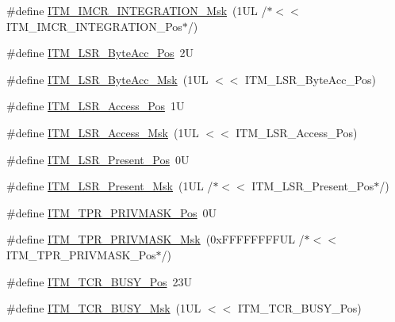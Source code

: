 \begin{DoxyCompactItemize}
\#define \mbox{\hyperlink{group___c_m_s_i_s___i_t_m_ga8838bd3dd04c1a6be97cd946364a3fd2}{I\+T\+M\+\_\+\+I\+M\+C\+R\+\_\+\+I\+N\+T\+E\+G\+R\+A\+T\+I\+O\+N\+\_\+\+Msk}}~(1\+U\+L /$\ast$$<$$<$ I\+T\+M\+\_\+\+I\+M\+C\+R\+\_\+\+I\+N\+T\+E\+G\+R\+A\+T\+I\+O\+N\+\_\+\+Pos$\ast$/)
\item 
\#define \mbox{\hyperlink{group___c_m_s_i_s___i_t_m_gabfae3e570edc8759597311ed6dfb478e}{I\+T\+M\+\_\+\+L\+S\+R\+\_\+\+Byte\+Acc\+\_\+\+Pos}}~2U
\item 
\#define \mbox{\hyperlink{group___c_m_s_i_s___i_t_m_ga91f492b2891bb8b7eac5b58de7b220f4}{I\+T\+M\+\_\+\+L\+S\+R\+\_\+\+Byte\+Acc\+\_\+\+Msk}}~(1\+U\+L $<$$<$ I\+T\+M\+\_\+\+L\+S\+R\+\_\+\+Byte\+Acc\+\_\+\+Pos)
\item 
\#define \mbox{\hyperlink{group___c_m_s_i_s___i_t_m_ga144a49e12b83ad9809fdd2769094fdc0}{I\+T\+M\+\_\+\+L\+S\+R\+\_\+\+Access\+\_\+\+Pos}}~1U
\item 
\#define \mbox{\hyperlink{group___c_m_s_i_s___i_t_m_gac8ae69f11c0311da226c0c8ec40b3d37}{I\+T\+M\+\_\+\+L\+S\+R\+\_\+\+Access\+\_\+\+Msk}}~(1\+U\+L $<$$<$ I\+T\+M\+\_\+\+L\+S\+R\+\_\+\+Access\+\_\+\+Pos)
\item 
\#define \mbox{\hyperlink{group___c_m_s_i_s___i_t_m_gaf5740689cf14564d3f3fd91299b6c88d}{I\+T\+M\+\_\+\+L\+S\+R\+\_\+\+Present\+\_\+\+Pos}}~0U
\item 
\#define \mbox{\hyperlink{group___c_m_s_i_s___i_t_m_gaa5bc2a7f5f1d69ff819531f5508bb017}{I\+T\+M\+\_\+\+L\+S\+R\+\_\+\+Present\+\_\+\+Msk}}~(1\+U\+L /$\ast$$<$$<$ I\+T\+M\+\_\+\+L\+S\+R\+\_\+\+Present\+\_\+\+Pos$\ast$/)
\item 
\#define \mbox{\hyperlink{group___c_m_s_i_s___i_t_m_ga7abe5e590d1611599df87a1884a352e8}{I\+T\+M\+\_\+\+T\+P\+R\+\_\+\+P\+R\+I\+V\+M\+A\+S\+K\+\_\+\+Pos}}~0U
\item 
\#define \mbox{\hyperlink{group___c_m_s_i_s___i_t_m_ga168e089d882df325a387aab3a802a46b}{I\+T\+M\+\_\+\+T\+P\+R\+\_\+\+P\+R\+I\+V\+M\+A\+S\+K\+\_\+\+Msk}}~(0x\+F\+F\+F\+F\+F\+F\+F\+F\+U\+L /$\ast$$<$$<$ I\+T\+M\+\_\+\+T\+P\+R\+\_\+\+P\+R\+I\+V\+M\+A\+S\+K\+\_\+\+Pos$\ast$/)
\item 
\#define \mbox{\hyperlink{group___c_m_s_i_s___i_t_m_ga9174ad4a36052c377cef4e6aba2ed484}{I\+T\+M\+\_\+\+T\+C\+R\+\_\+\+B\+U\+S\+Y\+\_\+\+Pos}}~23U
\item 
\#define \mbox{\hyperlink{group___c_m_s_i_s___i_t_m_ga43ad7cf33de12f2ef3a412d4f354c60f}{I\+T\+M\+\_\+\+T\+C\+R\+\_\+\+B\+U\+S\+Y\+\_\+\+Msk}}~(1\+U\+L $<$$<$ I\+T\+M\+\_\+\+T\+C\+R\+\_\+\+B\+U\+S\+Y\+\_\+\+Pos)
\item 
$$
\end{DoxyCompactItemize}
